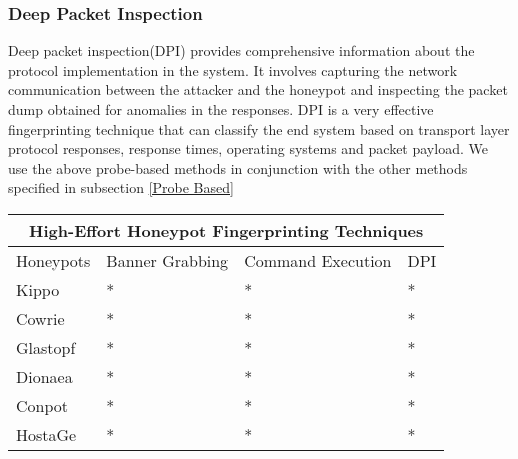 \documentclass[../main.tex]{subfiles}
\begin{document}
\subsubsection{Deep Packet Inspection}
Deep packet inspection(DPI) provides comprehensive information about the protocol implementation in the system. It involves capturing the network communication between the attacker and the honeypot and inspecting the packet dump obtained for anomalies in the responses. DPI is a very effective fingerprinting technique that can classify the end system based on transport layer protocol responses, response times, operating systems and packet payload. We use the above probe-based methods in conjunction with the other methods specified in subsection \ref{Probe Based}





\begin{tabular}{ |p{1.5cm}||p{1.5cm}|p{1.5cm}|p{1cm}| }
 \hline
 \multicolumn{4}{|c|}{High-Effort Honeypot Fingerprinting Techniques} \\
 \hline
 Honeypots & Banner Grabbing & Command Execution & DPI \\
 \hline
 Kippo   & *  &* & * \\
 Cowrie  & *  &* & * \\
 Glastopf& *  &* & *  \\
 Dionaea & *  &* & * \\
 Conpot  & *  &* & * \\
 HostaGe & *  &* & * \\
 \hline
\end{tabular}
\end{document}
